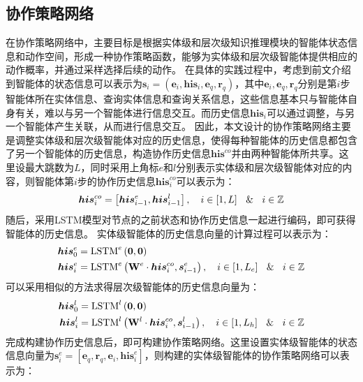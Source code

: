 \documentclass[algorithmlist, AutoFakeBold, AutoFakeSlant, figurelist, tablelist, nomlist, engineering]{seuthesix}
\begin{document}
\subsection{协作策略网络}
在协作策略网络中，主要目标是根据实体级和层次级知识推理模块的智能体状态信息和动作空间，形成一种协作策略函数，能够为实体级和层次级智能体提供相应的动作概率，并通过采样选择后续的动作。
在具体的实践过程中，考虑到前文介绍到智能体的状态信息可以表示为$\bm{s}_i = (\bm{e}_i, \bm{his}_i, \bm{e}_q, \bm{r}_q)$，其中$\bm{e}_i, \bm{e}_q, \bm{r}_q$分别是第$i$步智能体所在实体信息、查询实体信息和查询关系信息，这些信息基本只与智能体自身有关，难以与另一个智能体进行信息交互。而历史信息$\bm{his}_i$可以通过调整，与另一个智能体产生关联，从而进行信息交互。
因此，本文设计的协作策略网络主要是调整实体级和层次级智能体对应的历史信息，使得每种智能体的历史信息都包含了另一个智能体的历史信息，构造协作历史信息$\bm{his}^{co}$并由两种智能体所共享。这里设最大跳数为$L$，同时采用上角标$e$和$l$分别表示实体级和层次级智能体对应的内容，则智能体第$i$步的协作历史信息$\bm{his}_i^{co}$可以表示为：
\begin{equation}
  \bm{his}_{i}^{co} = \left[\bm{his}_{i-1}^e, \bm{his}_{i-1}^l\right], \quad i \in [1, L] \  \And \  i \in \mathbb{Z}
  \label{his_1}
\end{equation}
随后，采用LSTM模型对节点的之前状态和协作历史信息一起进行编码，即可获得智能体的历史信息。
实体级智能体的历史信息向量的计算过程可以表示为：
\begin{equation}
  \begin{aligned}
    \bm{his}_0^e &= \operatorname{LSTM}^e\left(\bm{0}, \bm{0}\right) \\
    \bm{his}_i^e &= \operatorname{LSTM}^e\left(\mathbf{W}^e \cdot \bm{his}_i^{co}, \bm{s}_{i-1}^e\right),\quad i \in [1, L_e] \  \And \  i \in \mathbb{Z}
  \end{aligned}
  \label{his_2}
\end{equation}
可以采用相似的方法求得层次级智能体的历史信息向量为：
\begin{equation}
  \begin{aligned}
    \bm{his}_0^l &=\operatorname{LSTM}^l\left(\bm{0}, \bm{0}\right) \\
    \bm{his}_i^l &= \operatorname{LSTM}^l\left(\mathbf{W}^l \cdot \bm{his}_i^{co}, \bm{s}_{i-1}^l\right),\quad i \in [1, L_h] \  \And \  i \in \mathbb{Z}
  \end{aligned}
  \label{his_3}
\end{equation}
完成构建协作历史信息后，即可构建协作策略网络。这里设置实体级智能体的状态信息向量为$\bm{s}_i^{e} = \left[\bm{e}_q, \bm{r}_q, \bm{e}_i, \bm{his}_i^e\right]$，则构建的实体级智能体的协作策略网络可以表示为：
\end{document}

